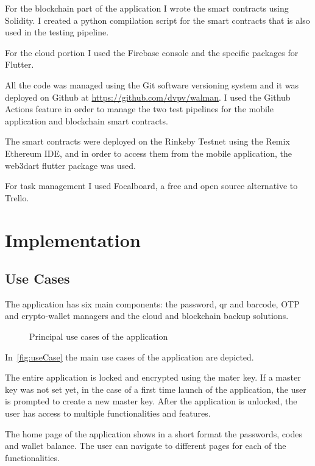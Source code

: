 \documentclass[a4paper,12pt]{report}
\begin{document}
For the blockchain part of the application I wrote the smart contracts using
Solidity. I created a python compilation script for the smart contracts that is
also used in the testing pipeline.

For the cloud portion I used the Firebase console and the specific packages for
Flutter.

All the code was managed using the Git software versioning system and it was
deployed on Github at \url{https://github.com/dvpv/walman}. I used the Github
Actions feature in order to manage the two test pipelines for the mobile
application and blockchain smart contracts.

The smart contracts were deployed on the Rinkeby Testnet using the Remix
Ethereum IDE, and in order to access them from the mobile application, the
web3dart\cite{web3dartDocs} flutter package was used.

For task management I used Focalboard, a free and open source alternative to
Trello.

\chapter{Implementation}

\section{Use Cases}

The application has six main components: the password, qr and barcode, OTP and
crypto-wallet managers and the cloud and blockchain backup solutions.

\begin{figure}[H]
    \centering
    \scalebox{0.45}{\large}
    \caption{Principal use cases of the application}\label{fig:useCase}
\end{figure}

In~\autoref{fig:useCase} the main use cases of the application are depicted.

The entire application is locked and encrypted using the mater key. If a master
key was not set yet, in the case of a first time launch of the application, the
user is prompted to create a new master key. After the application is unlocked,
the user has access to multiple functionalities and features.

The home page of the application shows in a short format the passwords, codes
and wallet balance. The user can navigate to different pages for each of the
functionalities.
\end{document}
